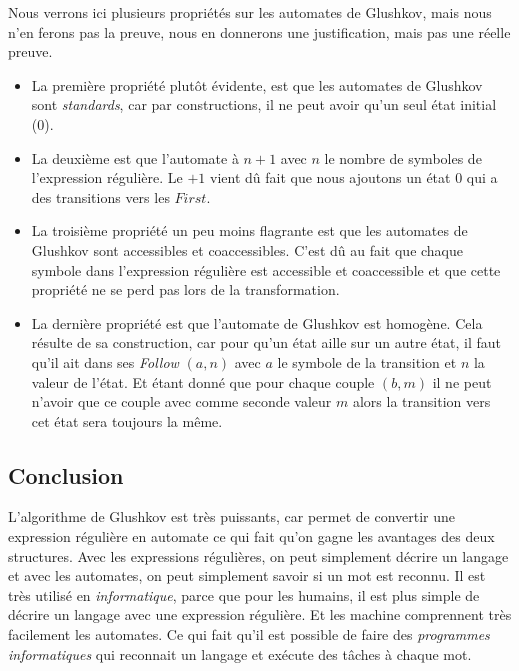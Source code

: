 \documentclass[12pt]{article}
\begin{document}
Nous verrons ici plusieurs propriétés sur les automates de Glushkov, mais nous
n'en ferons pas la preuve, nous en donnerons une justification, mais pas une
réelle preuve.

\vphantom{}

\begin{itemize}[label=\textbullet]
    \item La première propriété plutôt évidente, est que les automates de Glushkov sont
          \textit{standards}, car par constructions, il ne peut avoir qu'un seul état
          initial (0).

          \vphantom{}

    \item La deuxième est que l'automate à \(n + 1\) avec \(n\) le nombre de symboles de
          l'expression régulière. Le \(+ 1\) vient dû fait que nous ajoutons un état
          \(0\) qui a des transitions vers les \(First\).

          \vphantom{}

    \item La troisième propriété un peu moins flagrante est que les automates de Glushkov
          sont accessibles et coaccessibles. C'est dû au fait que chaque symbole dans
          l'expression régulière est accessible et coaccessible et que cette propriété ne
          se perd pas lors de la transformation.

          \vphantom{}

    \item La dernière propriété est que l'automate de Glushkov est homogène. Cela résulte
          de sa construction, car pour qu'un état aille sur un autre état, il faut qu'il
          ait dans ses \textit{Follow} \((a, n)\) avec \(a\) le symbole de la transition
          et \(n\) la valeur de l'état. Et étant donné que pour chaque couple \((b, m)\)
          il ne peut n'avoir que ce couple avec comme seconde valeur \(m\) alors la
          transition vers cet état sera toujours la même.
\end{itemize}

\subsection{Conclusion}

L'algorithme de Glushkov est très puissants, car permet de convertir une
expression régulière en automate ce qui fait qu'on gagne les avantages des deux
structures. Avec les expressions régulières, on peut simplement décrire un
langage et avec les automates, on peut simplement savoir si un mot est reconnu.
Il est très utilisé en \textit{informatique}, parce que pour les humains, il
est plus simple de décrire un langage avec une expression régulière. Et les
machine comprennent très facilement les automates. Ce qui fait qu'il est
possible de faire des \textit{programmes informatiques} qui reconnait un
langage et exécute des tâches à chaque mot.
\end{document}
